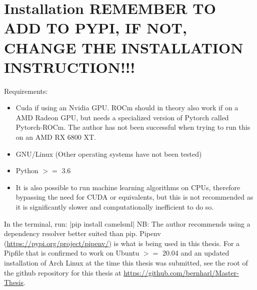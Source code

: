 \section{Installation REMEMBER TO ADD TO PYPI, IF NOT, CHANGE THE INSTALLATION INSTRUCTION!!!}
\label{camelsml documentation}
Requirements:
\begin{itemize}
    \item Cuda if using an Nvidia GPU. ROCm should in theory also work if on a AMD Radeon GPU, but needs a specialized version of Pytorch called Pytorch-ROCm. The author has not been successful when trying to run this on an AMD RX 6800 XT.
    \item GNU/Linux (Other operating systems have not been tested)
    \item Python $>=$ 3.6
    \item It is also possible to run machine learning algorithms on CPUs, therefore bypassing the need for CUDA or equivalents, but this is not recommended as it is significantly slower and computationally inefficient to do so.
\end{itemize}
In the terminal, run:
|pip install camelsml|
NB: The author recommends using a dependency resolver better suited than pip. 
Pipenv (\url{https://pypi.org/project/pipenv/}) is what is being used in this thesis.
For a Pipfile that is confirmed to work on Ubuntu $>=$ 20.04 and an updated installation of Arch Linux at the time this thesis was submitted, 
see the root of the github repository for this thesis at \url{https://github.com/bernharl/Master-Thesis}.
